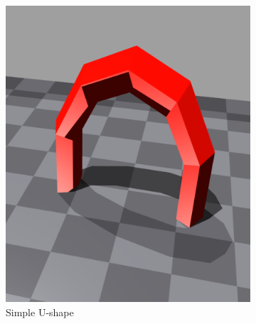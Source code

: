 \begin{figure}[H]
\begin{subfigure}[b]{0.3\textwidth}
         \includegraphics[width=\textwidth]{figures/6_/simple_u.png}
         \caption{Simple U-shape}
         \label{fig:6_obst_simple_u}
     \end{subfigure} 
     \hspace{0.15\textwidth}
     \begin{subfigure}[b]{0.3\textwidth}
         \centering
         \captionsetup{justification=centering}

\end{subfigure}
\end{figure}
